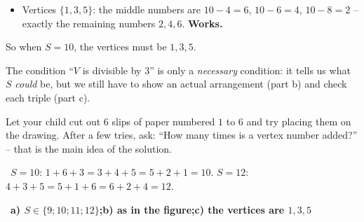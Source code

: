 \documentclass[11pt]{article}
\providecommand{\AnsWord}{Đáp số}
\newcommand{\ans}[1]{\par\smallskip{\bfseries\color{tmGreen!88!black}\AnsWord:}\ {\bfseries\color{AnsRed}#1}\par}
\newcommand{\verify}[1]{\par\smallskip\noindent{\bfseries\color{tmGreen!80!black}\faCheckCircle\ \CheckWord}\ #1\par}
\def\AnsWord{Answer}
\def\CheckWord{Check:}
\begin{document}
{\begin{itemize}[leftmargin=1.4em,itemsep=0pt,topsep=1pt]
  \item Vertices $\{1, 3, 5\}$: the middle numbers are $10 - 4 = 6$, $10 - 6 = 4$, $10 - 8 = 2$ -- exactly the remaining numbers
  $2, 4, 6$. \textbf{Works.}
\end{itemize}
So when $S = 10$, the vertices must be $1, 3, 5$.
\begin{warnbox}The condition ``$V$ is divisible by $3$'' is only a \emph{necessary} condition: it tells us what $S$ \emph{could} be, but
we still have to show an actual arrangement (part b) and check each triple (part c).\end{warnbox}
\begin{parentbox}Let your child cut out $6$ slips of paper numbered $1$ to $6$ and try placing them on the drawing. After a few tries,
ask: ``How many times is a vertex number added?'' -- that is the main idea of the solution.\end{parentbox}
\verify{$S = 10$: $1 + 6 + 3 = 3 + 4 + 5 = 5 + 2 + 1 = 10$. $S = 12$: $4 + 3 + 5 = 5 + 1 + 6 = 6 + 2 + 4 = 12$.}
\ans{a) $S \in \{9; 10; 11; 12\}$;\quad b) as in the figure;\quad c) the vertices are $1, 3, 5$}
}
\end{document}
